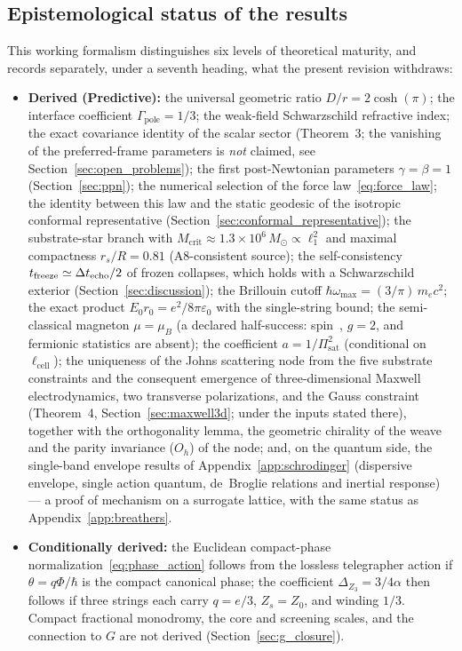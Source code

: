 \documentclass[11pt,a4paper]{article}
\theoremstyle{plain}
\theoremstyle{remark}
\begin{document}
\subsection*{Epistemological status of the results}
This working formalism distinguishes six levels of theoretical maturity, and records separately, under a seventh heading, what the present revision withdraws:
\begin{itemize}
    \item \textbf{Derived (Predictive):} the universal geometric ratio $D/r = 2\cosh(\pi)$; the interface coefficient $\Gamma_{\text{pole}} = 1/3$; the weak-field Schwarzschild refractive index; the exact covariance identity of the scalar sector (Theorem~3; the vanishing of the preferred-frame parameters is \emph{not} claimed, see Section~\ref{sec:open_problems}); the first post-Newtonian parameters $\gamma = \beta = 1$ (Section~\ref{sec:ppn}); the numerical selection of the force law~\eqref{eq:force_law}; the identity between this law and the static geodesic of the isotropic conformal representative (Section~\ref{sec:conformal_representative}); the substrate-star branch with $M_{\text{crit}} \approx 1.3\times10^{6}\,M_\odot \propto \ell_1^2$ and maximal compactness $r_s/R = 0.81$ (A8-consistent source); the self-consistency $t_{\rm freeze} \simeq \Delta t_{\rm echo}/2$ of frozen collapses, which holds with a Schwarzschild exterior (Section~\ref{sec:discussion}); the Brillouin cutoff $\hbar\omega_{\max} = (3/\pi)\,m_ec^2$; the exact product $E_0 r_0 = e^2/8\pi\varepsilon_0$ with the single-string bound; the semi-classical magneton $\mu = \mu_B$ (a declared half-success: spin~\textonehalf, $g = 2$, and fermionic statistics are absent); the coefficient $a = 1/\Pi_{\text{sat}}^2$ (conditional on $\ell_{\text{cell}}$); the uniqueness of the Johns scattering node from the five substrate constraints and the consequent emergence of three-dimensional Maxwell electrodynamics, two transverse polarizations, and the Gauss constraint (Theorem~4, Section~\ref{sec:maxwell3d}; under the inputs stated there), together with the orthogonality lemma, the geometric chirality of the weave and the parity invariance ($O_h$) of the node; and, on the quantum side, the single-band envelope results of Appendix~\ref{app:schrodinger} (dispersive envelope, single action quantum, de~Broglie relations and inertial response) --- a proof of mechanism on a surrogate lattice, with the same status as Appendix~\ref{app:breathers}.
    \item \textbf{Conditionally derived:} the Euclidean compact-phase normalization~\eqref{eq:phase_action} follows from the lossless telegrapher action if $\theta=q\Phi/\hbar$ is the compact canonical phase; the coefficient $\Delta_{Z_3}=3/4\alpha$ then follows if three strings each carry $q=e/3$, $Z_s=Z_0$, and winding $1/3$. Compact fractional monodromy, the core and screening scales, and the connection to $G$ are not derived (Section~\ref{sec:g_closure}).

\end{itemize}
\end{document}
